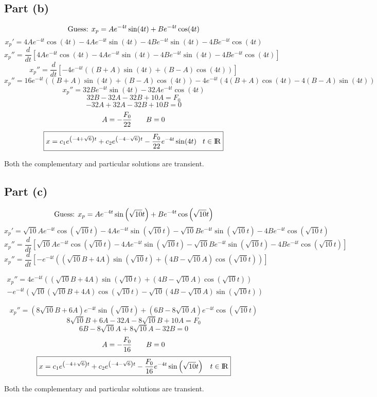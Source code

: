 \documentclass{article}
\begin{document}
\subsection*{Part (b)}
\[\textnormal{Guess: }x_p=Ae^{-4t}\sin(4t)+Be^{-4t}\cos(4t)\]
\[x_p'=4Ae^{-4t}\cos(4t)-4Ae^{-4t}\sin(4t)-4Be^{-4t}\sin(4t)-4Be^{-4t}\cos(4t)\]
\[x_p''=\frac{d}{dt}\left[4Ae^{-4t}\cos(4t)-4Ae^{-4t}\sin(4t)-4Be^{-4t}\sin(4t)-4Be^{-4t}\cos(4t)\right]\]
\[x_p''=\frac{d}{dt}\left[-4e^{-4t}((B+A)\sin(4t)+(B-A)\cos(4t))\right]\]
\[x_p''=16e^{-4t}((B+A)\sin(4t)+(B-A)\cos(4t))-4e^{-4t}(4(B+A)\cos(4t)-4(B-A)\sin(4t))\]
\[x_p''=32Be^{-4t}\sin(4t)-32Ae^{-4t}\cos(4t)\]
\[32B-32A-32B+10A=F_0\]
\[-32A+32A-32B+10B=0\]
\[A=-\frac{F_0}{22}\hspace{7 mm}B=0\]
\[\boxed{x=c_1e^{\left(-4+\sqrt{6}\right)t}+c_2e^{\left(-4-\sqrt{6}\right)t}-\frac{F_0}{22}e^{-4t}\sin(4t)\hspace{3 mm}t\in{\rm I\!R}}\]
\begin{center}
Both the complementary and particular solutions are transient.
\end{center}
\subsection*{Part (c)}
\[\textnormal{Guess: }x_p=Ae^{-4t}\sin\left(\sqrt{10}t\right)+Be^{-4t}\cos\left(\sqrt{10}t\right)\]
\[x_p'=\sqrt{10}Ae^{-4t}\cos\left(\sqrt{10}t\right)-4Ae^{-4t}\sin\left(\sqrt{10}t\right)-\sqrt{10}Be^{-4t}\sin\left(\sqrt{10}t\right)-4Be^{-4t}\cos\left(\sqrt{10}t\right)\]
\[x_p''=\frac{d}{dt}\left[\sqrt{10}Ae^{-4t}\cos\left(\sqrt{10}t\right)-4Ae^{-4t}\sin\left(\sqrt{10}t\right)-\sqrt{10}Be^{-4t}\sin\left(\sqrt{10}t\right)-4Be^{-4t}\cos\left(\sqrt{10}t\right)\right]\]
\[x_p''=\frac{d}{dt}\left[-e^{-4t}\left(\left(\sqrt{10}B+4A\right)\sin\left(\sqrt{10}t\right)+\left(4B-\sqrt{10}A\right)\cos\left(\sqrt{10}t\right)\right)\right]\]
\begin{center}
\begin{multline*}
x_p''=4e^{-4t}\left(\left(\sqrt{10}B+4A\right)\sin\left(\sqrt{10}t\right)+\left(4B-\sqrt{10}A\right)\cos\left(\sqrt{10}t\right)\right)\\
-e^{-4t}\left(\sqrt{10}\left(\sqrt{10}B+4A\right)\cos\left(\sqrt{10}t\right)-\sqrt{10}\left(4B-\sqrt{10}A\right)\sin\left(\sqrt{10}t\right)\right)
\end{multline*}
\end{center}
\[x_p''=\left(8\sqrt{10}B+6A\right)e^{-4t}\sin\left(\sqrt{10}t\right)+\left(6B-8\sqrt{10}A\right)e^{-4t}\cos\left(\sqrt{10}t\right)\]
\[8\sqrt{10}B+6A-32A-8\sqrt{10}B+10A=F_0\]
\[6B-8\sqrt{10}A+8\sqrt{10}A-32B=0\]
\[A=-\frac{F_0}{16}\hspace{7 mm}B=0\]
\[\boxed{x=c_1e^{\left(-4+\sqrt{6}\right)t}+c_2e^{\left(-4-\sqrt{6}\right)t}-\frac{F_0}{16}e^{-4t}\sin\left(\sqrt{10}t\right)\hspace{3 mm}t\in{\rm I\!R}}\]
\begin{center}
Both the complementary and particular solutions are transient.
\end{center}
\end{document}
